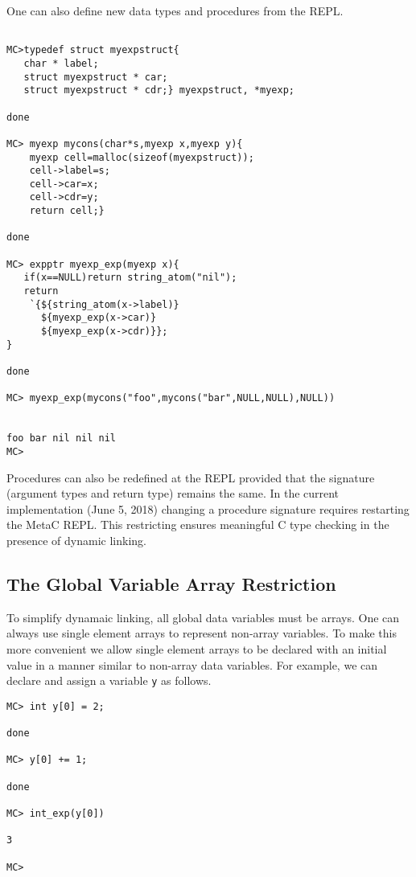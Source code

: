 \documentclass{article}
\begin{document}
One can also define new data types and procedures from the REPL.

\begin{verbatim}

MC>typedef struct myexpstruct{
   char * label;
   struct myexpstruct * car;
   struct myexpstruct * cdr;} myexpstruct, *myexp;

done

MC> myexp mycons(char*s,myexp x,myexp y){
    myexp cell=malloc(sizeof(myexpstruct));
    cell->label=s;
    cell->car=x;
    cell->cdr=y;
    return cell;}

done

MC> expptr myexp_exp(myexp x){
   if(x==NULL)return string_atom("nil");
   return
    `{${string_atom(x->label)}
      ${myexp_exp(x->car)}
      ${myexp_exp(x->cdr)}};
}

done

MC> myexp_exp(mycons("foo",mycons("bar",NULL,NULL),NULL))


foo bar nil nil nil
MC>
\end{verbatim}

Procedures can also be redefined at the REPL provided that the
signature (argument types and return type) remains the same.  In the
current implementation (June 5, 2018) changing a procedure signature
requires restarting the MetaC REPL.  This restricting ensures
meaningful C type checking in the presence of dynamic linking.

\subsection{The Global Variable Array Restriction}

To simplify dynamaic linking, all global data
variables must be arrays. One can always use single element
arrays to represent non-array variables.  To make this more convenient
we allow single element arrays to be declared with an initial value in a
manner similar to non-array data variables.  For example, we can declare and assign a variable {\tt y}
as follows.

\begin{verbatim}
MC> int y[0] = 2;

done

MC> y[0] += 1;

done

MC> int_exp(y[0])

3

MC>
\end{verbatim}
\end{document}
